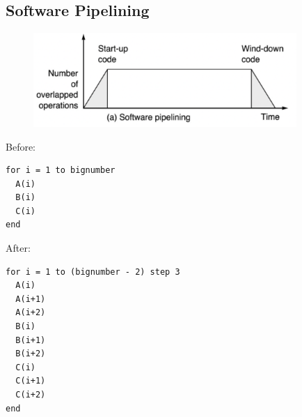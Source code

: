 \documentclass[a4paper]{article}
\theoremstyle{definition}
\begin{document}
\subsection{Software Pipelining}
\begin{figure}[htbp]
  \centering
  \includegraphics[width=10cm]{./img/sw_pipeline.png}
\end{figure}
Before:
\begin{verbatim}
for i = 1 to bignumber
  A(i)
  B(i)
  C(i)
end
\end{verbatim}
After:
\begin{verbatim}
for i = 1 to (bignumber - 2) step 3
  A(i)
  A(i+1)
  A(i+2)
  B(i)
  B(i+1)
  B(i+2)
  C(i)
  C(i+1)
  C(i+2)
end
\end{verbatim}
\end{document}
